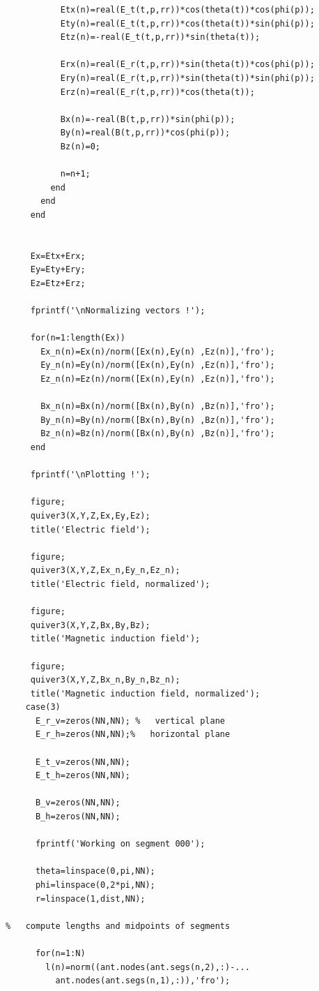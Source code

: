 \documentclass[a4paper,11pt]{thesis}
\begin{document}
\begin{verbatim}
           Etx(n)=real(E_t(t,p,rr))*cos(theta(t))*cos(phi(p));
           Ety(n)=real(E_t(t,p,rr))*cos(theta(t))*sin(phi(p));
           Etz(n)=-real(E_t(t,p,rr))*sin(theta(t));

           Erx(n)=real(E_r(t,p,rr))*sin(theta(t))*cos(phi(p));
           Ery(n)=real(E_r(t,p,rr))*sin(theta(t))*sin(phi(p));
           Erz(n)=real(E_r(t,p,rr))*cos(theta(t));

           Bx(n)=-real(B(t,p,rr))*sin(phi(p));
           By(n)=real(B(t,p,rr))*cos(phi(p));
           Bz(n)=0;

           n=n+1;
         end
       end
     end


     Ex=Etx+Erx;
     Ey=Ety+Ery;
     Ez=Etz+Erz;

     fprintf('\nNormalizing vectors !');

     for(n=1:length(Ex))
       Ex_n(n)=Ex(n)/norm([Ex(n),Ey(n) ,Ez(n)],'fro');
       Ey_n(n)=Ey(n)/norm([Ex(n),Ey(n) ,Ez(n)],'fro');
       Ez_n(n)=Ez(n)/norm([Ex(n),Ey(n) ,Ez(n)],'fro');

       Bx_n(n)=Bx(n)/norm([Bx(n),By(n) ,Bz(n)],'fro');
       By_n(n)=By(n)/norm([Bx(n),By(n) ,Bz(n)],'fro');
       Bz_n(n)=Bz(n)/norm([Bx(n),By(n) ,Bz(n)],'fro');
     end

     fprintf('\nPlotting !');

     figure;
     quiver3(X,Y,Z,Ex,Ey,Ez);
     title('Electric field');

     figure;
     quiver3(X,Y,Z,Ex_n,Ey_n,Ez_n);
     title('Electric field, normalized');

     figure;
     quiver3(X,Y,Z,Bx,By,Bz);
     title('Magnetic induction field');

     figure;
     quiver3(X,Y,Z,Bx_n,By_n,Bz_n);
     title('Magnetic induction field, normalized');
    case(3)
      E_r_v=zeros(NN,NN); %   vertical plane
      E_r_h=zeros(NN,NN);%   horizontal plane

      E_t_v=zeros(NN,NN);
      E_t_h=zeros(NN,NN);

      B_v=zeros(NN,NN);
      B_h=zeros(NN,NN);

      fprintf('Working on segment 000');

      theta=linspace(0,pi,NN);
      phi=linspace(0,2*pi,NN);
      r=linspace(1,dist,NN);

%   compute lengths and midpoints of segments

      for(n=1:N)
        l(n)=norm((ant.nodes(ant.segs(n,2),:)-...
          ant.nodes(ant.segs(n,1),:)),'fro');


\end{verbatim}
\end{document}
